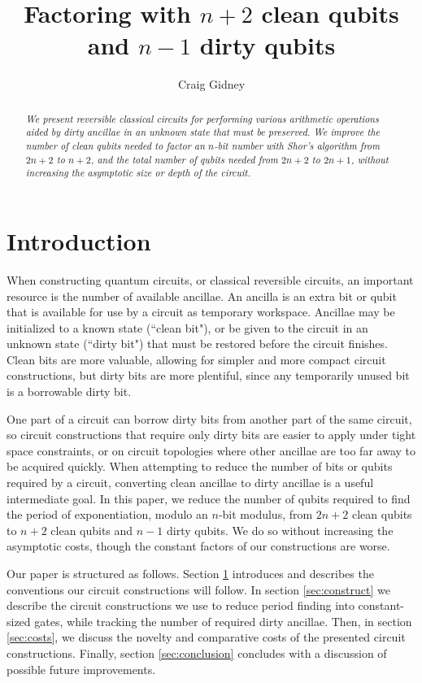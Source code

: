 \documentclass[twocolumn]{article}
\title{Factoring with $n+2$ clean qubits and $n-1$ dirty qubits}
\author{Craig Gidney}
\begin{document}
\maketitle

\begin{abstract}
\em
We present reversible classical circuits for performing various arithmetic operations aided by dirty ancillae in an unknown state that must be preserved.
We improve the number of clean qubits needed to factor an $n$-bit number with Shor's algorithm \cite{Shor1999} from $2n+2$ \cite{takahashi2006, haner2016} to $n+2$, and the total number of qubits needed from $2n+2$ to $2n+1$, without increasing the asymptotic size or depth of the circuit.
\end{abstract}

\section{Introduction} \label{sec:introduction}

When constructing quantum circuits, or classical reversible circuits, an important resource is the number of available ancillae.
An ancilla is an extra bit or qubit that is available for use by a circuit as temporary workspace.
Ancillae may be initialized to a known state (``clean bit"), or be given to the circuit in an unknown state (``dirty bit") that must be restored before the circuit finishes.
Clean bits are more valuable, allowing for simpler and more compact circuit constructions, but dirty bits are more plentiful, since any temporarily unused bit is a borrowable dirty bit.

One part of a circuit can borrow dirty bits from another part of the same circuit, so circuit constructions that require only dirty bits are easier to apply under tight space constraints, or on circuit topologies where other ancillae are too far away to be acquired quickly.
When attempting to reduce the number of bits or qubits required by a circuit, converting clean ancillae to dirty ancillae is a useful intermediate goal.
In this paper, we reduce the number of qubits required to find the period of exponentiation, modulo an $n$-bit modulus, from $2n+2$ clean qubits \cite{takahashi2006, haner2016} to $n+2$ clean qubits and $n-1$ dirty qubits.
We do so without increasing the asymptotic costs, though the constant factors of our constructions are worse.

Our paper is structured as follows.
Section \ref{sec:introduction} introduces and describes the conventions our circuit constructions will follow.
In section \ref{sec:construct} we describe the circuit constructions we use to reduce period finding into constant-sized gates, while tracking the number of required dirty ancillae.
Then, in section \ref{sec:costs}, we discuss the novelty and comparative costs of the presented circuit constructions.
Finally, section \ref{sec:conclusion} concludes with a discussion of possible future improvements.
\end{document}

